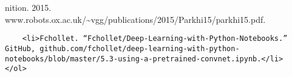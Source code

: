 \documentclass[11pt]{article}
\begin{document}
nition. 2015.
www.robots.ox.ac.uk/\textasciitilde{}vgg/publications/2015/Parkhi15/parkhi15.pdf.

\begin{verbatim}
    <li>Fchollet. “Fchollet/Deep-Learning-with-Python-Notebooks.” GitHub, github.com/fchollet/deep-learning-with-python-notebooks/blob/master/5.3-using-a-pretrained-convnet.ipynb.</li>
</ol>
\end{verbatim}


    
    
    
    
\end{document}
